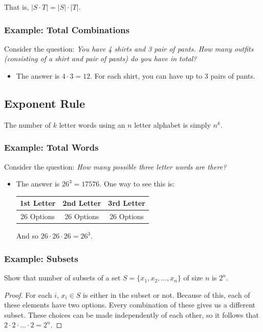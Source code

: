 \documentclass[letterpaper]{article}
\begin{document}
\bigskip 

That is, $|S \cdot T| = |S| \cdot |T|$.

\subsubsection{Example: Total Combinations}
Consider the question: \emph{You have 4 shirts and 3 pair of pants. How many outfits (consisting of a shirt and pair of pants) do you have in total?} 

\begin{itemize}
    \item The answer is $4 \cdot 3 = 12$. For each shirt, you can have up to 3 pairs of pants. 
\end{itemize}

\subsection{Exponent Rule}
The number of $k$ letter words using an $n$ letter alphabet is simply $n^k$. 

\subsubsection{Example: Total Words}
Consider the question: \emph{How many possible three letter words are there?} 

\begin{itemize}
    \item The answer is $26^3 = 17576$. One way to see this is:
    \begin{center}
        \begin{tabular}{c|c|c}
            1st Letter & 2nd Letter & 3rd Letter \\ 
            \hline 
            26 Options & 26 Options & 26 Options
        \end{tabular}
    \end{center}
    And so $26 \cdot 26 \cdot 26 = 26^3$.
\end{itemize}

\subsubsection{Example: Subsets}
Show that number of subsets of a set $S = \{x_1, x_2, ..., x_n\}$ of size $n$ is $2^n$. 

\begin{proof}
    For each $i$, $x_i \in S$ is either in the subset or not. Because of this, each of these elements have two options. Every combination of these gives us a different subset. These choices can be made independently of each other, so it follows that $2 \cdot 2 \cdot ... \cdot 2 = 2^n$. 
\end{proof}
\end{document}

